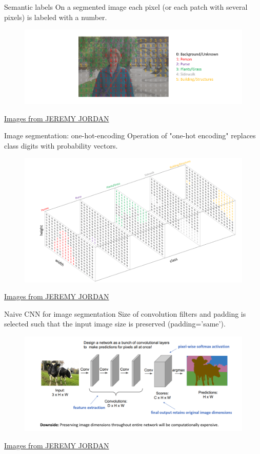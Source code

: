 \documentclass[handout]{beamer}
\begin{document}
\begin{frame}{Semantic labels}
    On a segmented image each pixel (or each patch with several pixels) is labeled with a number.
    \begin{figure}
   \centering
    \includegraphics[width=.8\textwidth]{fig/L2/Screen-Shot-2018-05-16-at-9.36.38-PM.png}
\end{figure}
{\tiny \href{https://www.jeremyjordan.me/semantic-segmentation/}{ Images from JEREMY JORDAN}}
\end{frame}

\begin{frame}{Image segmentation: one-hot-encoding}
    Operation of "one-hot encoding" replaces class digits with probability vectors.
    \begin{figure}
   \centering
    \includegraphics[width=.8\textwidth]{fig/L2/Screen-Shot-2018-05-16-at-9.36.00-PM.png}
\end{figure}
{\tiny \href{https://www.jeremyjordan.me/semantic-segmentation/}{ Images from JEREMY JORDAN}}
\end{frame}

\begin{frame}{Naive CNN for image segmentation}
    Size of convolution filters and padding is selected such that the input image size is preserved (padding='same').
    \begin{figure}
   \centering
    \includegraphics[width=.9\textwidth]{fig/L2/Screen-Shot-2018-05-19-at-12.32.20-PM.png}
\end{figure}
{\tiny \href{https://www.jeremyjordan.me/semantic-segmentation/}{ Images from JEREMY JORDAN}}
\end{frame}
\end{document}
